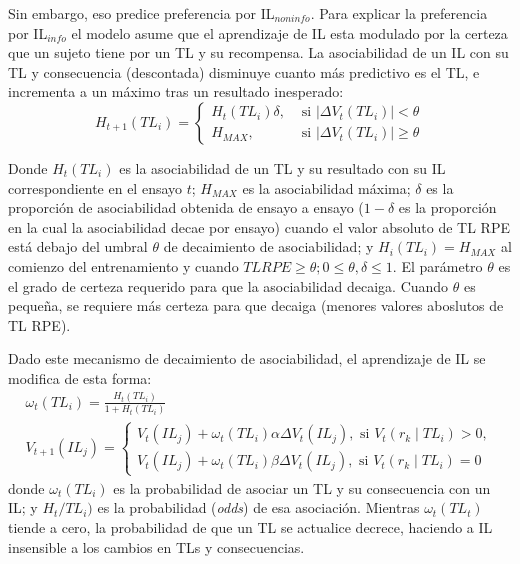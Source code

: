 \documentclass[a4paper,12pt]{article}
\begin{document}
Sin embargo, eso predice preferencia por IL$_{noninfo}$. Para explicar la preferencia por IL$_{info}$ el modelo asume que el aprendizaje de IL esta modulado por la certeza que un sujeto tiene por un TL y su recompensa. La asociabilidad de un IL con su TL y consecuencia (descontada) disminuye cuanto más predictivo es el TL, e incrementa a un máximo tras un resultado inesperado:
$$
H_{t+1}\left(T L_{i}\right)=\left\{\begin{array}{ll}
	H_{t}\left(T L_{i}\right) \delta, & \mbox { si }\left|\Delta V_{t}\left(T L_{i}\right)\right|<\theta \\
H_{M A X}, & \mbox { si }\left|\Delta V_{t}\left(T L_{i}\right)\right| \geq \theta
\end{array}\right.
$$

Donde $H_t(TL_i)$ es la asociabilidad de un TL y su resultado con su IL correspondiente en el ensayo $t$; $H_{MAX}$ es la asociabilidad máxima; $\delta$ es la proporción de asociabilidad obtenida de ensayo a ensayo ($1-\delta$ es la proporción en la cual la asociabilidad decae por ensayo) cuando el valor absoluto de TL RPE está debajo del umbral $\theta$ de decaimiento de asociabilidad; y $H_i(TL_i)=H_{MAX}$ al comienzo del entrenamiento y cuando $TL RPE \geq \theta; 0 \leq \theta, \delta \leq 1$. El parámetro $\theta$ es el grado de certeza requerido para que la asociabilidad decaiga. Cuando $\theta$ es pequeña, se requiere más certeza para que decaiga (menores valores aboslutos de TL RPE).

Dado este mecanismo de decaimiento de asociabilidad, el aprendizaje de IL se modifica de esta forma:
$$
\begin{array}{l}
	\omega_{t}\left(T L_{i}\right)=\frac{H_{t}\left(T L_{i}\right)}{1+H_{t}\left(T L_{i}\right)} \\
	V_{t+1}\left(I L_{j}\right)=\left\{\begin{array}{l}
		V_{t}\left(I L_{j}\right)+\omega_{t}\left(T L_{i}\right) \alpha \Delta V_{t}\left(I L_{j}\right), \mbox { si } V_{t}\left(r_{k} \mid T L_{i}\right)>0, \\
	V_{t}\left(I L_{j}\right)+\omega_{t}\left(T L_{i}\right) \beta \Delta V_{t}\left(I L_{j}\right), \mbox { si } V_{t}\left(r_{k} \mid T L_{i}\right)=0
\end{array}\right.
\end{array}
$$
donde $\omega_t(TL_i)$ es la probabilidad de asociar un TL y su consecuencia con un IL; y $H_t/TL_i)$ es la probabilidad ({\slshape odds}) de esa asociación. Mientras $\omega_t(TL_t)$ tiende a cero, la probabilidad de que un TL se actualice decrece, haciendo a IL insensible a los cambios en TLs y consecuencias.
\end{document}
